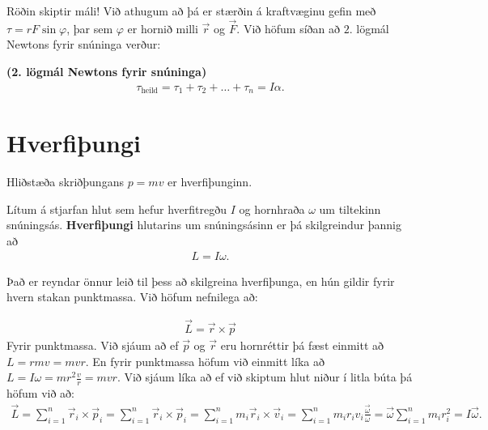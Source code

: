 Röðin skiptir máli! Við athugum að þá er stærðin á kraftvæginu gefin með $\tau = rF\sin\varphi$, þar sem $\varphi$ er hornið milli $\vec{r}$ og $\vec{F}$. Við höfum síðan að $2.$ lögmál Newtons fyrir snúninga verður:

\begin{tcolorbox}
\begin{theorem}
\textbf{(2. lögmál Newtons fyrir snúninga)} 
\begin{align*}
    \tau_{\text{heild}} = \tau_1 + \tau_2 + \ldots + \tau_n = I \alpha.
\end{align*}
\end{theorem}
\end{tcolorbox}


\section{Hverfiþungi}

Hliðstæða skriðþungans $p = mv$ er hverfiþunginn.
\begin{tcolorbox}
\begin{definition}
Lítum á stjarfan hlut sem hefur hverfitregðu $I$ og hornhraða $\omega$ um tiltekinn snúningsás. \textbf{Hverfiþungi} hlutarins um snúningsásinn er þá skilgreindur þannig að
\begin{align*}
    L = I\omega.
\end{align*}
\end{definition}
\end{tcolorbox}

Það er reyndar önnur leið til þess að skilgreina hverfiþunga, en hún gildir fyrir hvern stakan punktmassa. Við höfum nefnilega að:

\begin{align*}
    \vec{L} = \vec{r}\times \vec{p}
\end{align*}
Fyrir punktmassa. Við sjáum að ef $\vec{p}$ og $\vec{r}$ eru hornréttir þá fæst einmitt að $L = rmv = mvr$. En fyrir punktmassa höfum við einmitt líka að $L = I\omega = mr^2 \frac{v}{r} = mvr$. Við sjáum líka að ef við skiptum hlut niður í litla búta þá höfum við að:
\begin{align*}
    \vec{L} = \sum_{i=1}^{n} \vec{r}_i \times \vec{p}_i =  \sum_{i=1}^{n} \vec{r}_i \times \vec{p}_i = \sum_{i=1}^{n} m_i \vec{r}_i \times \vec{v}_i = \sum_{i=1}^{n} m_i r_i v_i \frac{\vec{\omega}}{\omega} = \vec{\omega} \sum_{i=1}^{n}m_i r_i^2 = I\vec{\omega}.
\end{align*}



